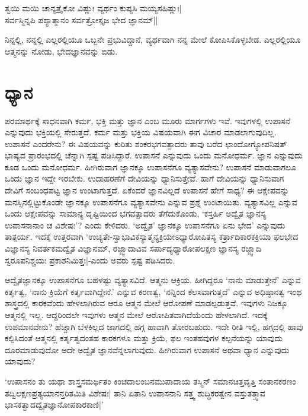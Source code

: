 \begin{shloka}
ತ್ವಯಿ ಮಯಿ ಚಾನ್ಯತ್ರೈಕೋ ವಿಷ್ಣುಃ ವ್ಯರ್ಥಂ ಕುಪ್ಯಸಿ ಮಯ್ಯಸಹಿಷ್ಣುಃ|\\
ಸರ್ವಸ್ಮಿನ್ನಪಿ ಪಶ್ಯಾತ್ಮಾನಂ ಸರ್ವತ್ರೋಸ್ತೃಜ ಭೇದ ಜ್ಞಾನಮ್||
\end{shloka}

ನಿನ್ನಲ್ಲಿ, ನನ್ನಲ್ಲಿ ಎಲ್ಲರಲ್ಲಿಯೂ ಒಬ್ಬನೇ ಪ್ರಭುವಿದ್ದಾನೆ, ವ್ಯರ್ಥವಾಗಿ ನನ್ನ ಮೇಲೆ ಕೋಪಿಸಿಕೊಳ್ಳಬೇಡ. ಎಲ್ಲರಲ್ಲಿಯೂ ಆತ್ಮನನ್ನು ನೋಡು, ಭೇದಜ್ಞಾನವನ್ನು ಬಿಡು.


\newpage


\section{ಧ್ಯಾನ}

ಪರಮಾರ್ಥಕ್ಕೆ ಸಾಧನವಾಗಿ ಕರ್ಮ, ಭಕ್ತಿ ಮತ್ತು ಜ್ಞಾನ ಎಂಬ ಮೂರು ಮಾರ್ಗಗಳು ಇವೆ. ಇವುಗಳಲ್ಲಿ ಉಪಾಸನೆ ಎನ್ನುವುದು ಭಕ್ತಿಯಲ್ಲಿ ಸೇರುತ್ತದೆ. ಕರ್ಮ ಮತ್ತು ಭಕ್ತಿಯ ವಿಷಯವಾಗಿ ಈಗ ವಿಚಾರ ಮಾಡಲಾಗುವುದಿಲ್ಲ. ಉಪಾಸನೆ ಎಂದರೇನು? ಈ ವಿಷಯವನ್ನು ಕುರಿತು ಶಂಕರಭಗವತ್ಪಾದರು ತಾವು ಬರೆದ ಛಾಂದೋಗ್ಯೋಪನಿಷತ್ ಭಾಷ್ಯದ ಪ್ರಾರಂಭದಲ್ಲಿ ಚೆನ್ನಾಗಿ ಸ್ಪಷ್ಟ ಪಡಿಸಿದ್ದಾರೆ. ಉಪಾಸನೆ ಎನ್ನುವುದು ಒಂದು ಮನೋಧರ್ಮ. ಜ್ಞಾನ ಎನ್ನುವುದು ಕೂಡ ಒಂದು ಮನೋಧರ್ಮ. ಹೀಗಿರುವಾಗ ಜ್ಞಾನಕ್ಕೂ ಉಪಾಸನೆಗೂ ವ್ಯತ್ಯಾಸವೇನು? ಉಪಾಸನೆ ಮಾಡುವಾಗಲೂ ಒಂದು ಜ್ಞಾನ ಇದ್ದೇ ಇರಬೇಕು. ಉದಾಹರಣೆಗೆ ದೇವಿಯನ್ನು ಧ್ಯಾನಿಸುತ್ತೇವೆ. ಹಾಗೆ ದೇವಿಯನ್ನು ಧ್ಯಾನಿಸುವಾಗ ದೇವಿಗೆ ಸಂಬಂಧಪಟ್ಟ ಜ್ಞಾನ ಉಂಟಾಗುತ್ತದೆ. ಏಕೆಂದರೆ ಜ್ಞಾನವಿಲ್ಲದೆ ಉಪಾಸನೆ ಹೇಗೆ ಸಾಧ್ಯ? ಈ ಆಕ್ಷೇಪವನ್ನು ಮನಸ್ಸಿನಲ್ಲಿಟ್ಟುಕೊಂಡೇ ಜ್ಞಾನಕ್ಕೂ ಉಪಾಸನೆಗೂ ವ್ಯತ್ಯಾಸವೇನು ಎನ್ನುವ ಪ್ರಶ್ನೆ ಉಂಟಾಯಿತು. ವ್ಯತ್ಯಾಸವಿಲ್ಲ ಎನ್ನುವ ಒಂದು ಆಕ್ಷೇಪವನ್ನು ಸಾಮಾನ್ಯ ದೃಷ್ಟಿಯಿಂದ ಭಗವತ್ಪಾದರು ತೆಗೆದುಕೊಂಡು, `ಕಸ್ತರ್ಹಿ ಅದ್ವೈತ ಜ್ಞಾನಸ್ಯ ಉಪಾಸನಾನಾಂ ಚ ವಿಶೇಷಃ'? ಎಂದು ಕೇಳಿದರು. `ಅದ್ವೈತ' ಜ್ಞಾನಕ್ಕೂ ಉಪಾಸನೆಗೂ ಏನು ಭೇದ' ಎನ್ನುವುದು ತಾತ್ಪರ್ಯ. ಇದಕ್ಕೆ ಉತ್ತರವಾಗಿ `ಉಚ್ಯತೇ-ಸ್ವಾಭಾವಿಕಸ್ಯಾತ್ಮನ್ಯಕ್ರಿಯೇಽಧ್ಯಾರೋಪಿತಸ್ಯ ಕರ್ತ್ರಾದಿಕಾರಕಕ್ರಿಯಾ ಫಲಭೇದ ವಿಜ್ಞಾನಸ್ಯ ನಿವರ್ತಕಮದ್ವೈತ ವಿಜ್ಞಾನಮ್, ರಜ್ಜ್ವಾದಾವಿವ ಸರ್ಪಾದ್ಯಧ್ಯಾರೋಪಲಕ್ಷಣ ಜ್ಞಾನಸ್ಯ ರಜ್ಜ್ವಾದಿ ಸ್ವರೂಪನಿಶ್ಚಯಃ ಪ್ರಕಾಶನಿಮಿತ್ತಃ|-ಎಂದು ಅವರು ಸ್ಪಷ್ಟ ಪಡಿಸಿದರು.

ಆದ್ವೈತಜ್ಞಾನಕ್ಕೂ ಉಪಾಸನೆಗೂ ಬಹಳಷ್ಟು ವ್ಯತ್ಯಾಸವಿದೆ. ಆತ್ಮನು ಆಕ್ರಿಯ. ಹೀಗಿದ್ದರೂ `ನಾನು ಮಾಡುತ್ತೇನೆ' ಎನ್ನುವ ಕರ್ತೃತ್ವ, `ನಾನು ಕ್ರಿಯೆಗೆ ಕರ್ತೃವಾಗಿದ್ದೇನೆ.' ಎನ್ನುವ ಕರಣತ್ವ, `ನನ್ನಿಂದ ಕೆಲಸವಾಗುತ್ತದೆ' ಎನ್ನುವ ಅಧಿಷ್ಠಾನತ್ವ ಇಂಥ ಶಾಸ್ತ್ರದಲ್ಲಿ ಕಾರಕವೆಂದು ಹೇಳಲಾಗಿರುವ ಆರೂ ಆತ್ಮನ ಮೇಲೆ ಆರೋಪಣೆ ಮಾಡಲ್ಪಡುತ್ತವೆ. ಇವುಗಳು ನಿಜಕ್ಕೂ ಆತ್ಮನಲ್ಲಿ ಇಲ್ಲ. ಆದ್ದರಿಂದಲೇ ಇವುಗಳು ಆತ್ಮನ ಮೇಲೆ ಆರೋಪಿತವಾಗಿದೆಯೆಂದು ಹೇಳಲಾಗಿದೆ. ಇದಕ್ಕೆ ಉಪಮಾನವೇನು? ಹೆಚ್ಚಾಗಿ ಬೆಳಕಿಲ್ಲದ ಜಾಗದಲ್ಲಿ ಹಗ್ಗ ಹಾವಾಗಿ ತೋರಬಹುದು. ಇದೇ ರೀತಿ ಇಲ್ಲಿ, ಹಗ್ಗದಲ್ಲಿ ಹಾವು ಕಲ್ಪಿಸಿದಂತೆ ಆತ್ಮನಲ್ಲಿ ಕರ್ತೃತ್ವದಂತಹ ಕಾರಕಗಳೂ ಮತ್ತು ಕ್ರಿಯೆ, ಫಲ ಇಂತಹವುಗಳ ಕಲ್ಪನೆಯನ್ನು ಯಾವುದು ದೂರಮಾಡುವುದೋ ಅದೇ ಅದ್ವೈತ ಜ್ಞಾನವೆನ್ನಲಾಗುವುದು. ಹೀಗಿರುವಾಗ ಉಪಾಸನೆ ಅಥವಾ ಧ್ಯಾನ ಎನ್ನುವುದು ಯಾವುದು?

`ಉಪಾಸನಂ ತು ಯಥಾ ಶಾಸ್ತ್ರಸಮರ್ಥಿತಂ ಕಿಂಚದಾಲಂಬನಮುಪಾದಾಯ ತಸ್ಮಿನ್ ಸಮಾನಚಿತ್ತವೃತ್ತಿ ಸಂತಾನಕರಣಂ ತದ್ವಿಲಕ್ಷಣಪ್ರತ್ಯಯಾನನ್ತರಿತಮಿತಿ ವಿಶೇಷಃ| ತಾನಿ ಏತಾನಿ ಉಪಾಸನಾನಿ ಸತ್ತ್ವ ಶುದ್ಧಿಕರತ್ವೇನ ವಸ್ತುತತ್ತ್ವಾವ ಭಾಸಕತ್ವಾದದ್ವೈತಜ್ಞಾನೋಪಕಾರಕಾಣಿ|'

